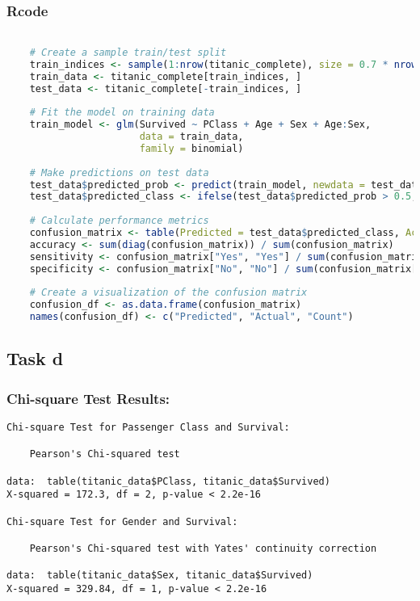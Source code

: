 \documentclass{article}
\begin{document}
\subsubsection{Rcode}
\begin{lstlisting}[language=R, breaklines=true, keywordstyle=\color{magenta},
    numberstyle=\tiny\color{codegray},
    stringstyle=\color{codepurple},
    basicstyle=\ttfamily\footnotesize,
    aboveskip=0pt, belowskip=0pt]

    # Create a sample train/test split
    train_indices <- sample(1:nrow(titanic_complete), size = 0.7 * nrow(titanic_complete))
    train_data <- titanic_complete[train_indices, ]
    test_data <- titanic_complete[-train_indices, ]
    
    # Fit the model on training data
    train_model <- glm(Survived ~ PClass + Age + Sex + Age:Sex, 
                       data = train_data, 
                       family = binomial)
    
    # Make predictions on test data
    test_data$predicted_prob <- predict(train_model, newdata = test_data, type = "response")
    test_data$predicted_class <- ifelse(test_data$predicted_prob > 0.5, "Yes", "No")
    
    # Calculate performance metrics
    confusion_matrix <- table(Predicted = test_data$predicted_class, Actual = test_data$Survived)
    accuracy <- sum(diag(confusion_matrix)) / sum(confusion_matrix)
    sensitivity <- confusion_matrix["Yes", "Yes"] / sum(confusion_matrix[, "Yes"])
    specificity <- confusion_matrix["No", "No"] / sum(confusion_matrix[, "No"])
    
    # Create a visualization of the confusion matrix
    confusion_df <- as.data.frame(confusion_matrix)
    names(confusion_df) <- c("Predicted", "Actual", "Count")
\end{lstlisting}

\subsection{Task d}

\subsubsection{Chi-square Test Results:}
\begin{verbatim}
Chi-square Test for Passenger Class and Survival:

	Pearson's Chi-squared test

data:  table(titanic_data$PClass, titanic_data$Survived)
X-squared = 172.3, df = 2, p-value < 2.2e-16

Chi-square Test for Gender and Survival:

	Pearson's Chi-squared test with Yates' continuity correction

data:  table(titanic_data$Sex, titanic_data$Survived)
X-squared = 329.84, df = 1, p-value < 2.2e-16
\end{verbatim}
\end{document}
